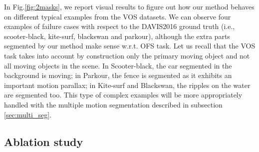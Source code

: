 \documentclass[10pt,twocolumn,letterpaper]{article}
\begin{document}
In Fig.\ref{fig:2masks}, we report visual results to figure out how our method behaves on different typical examples from the VOS datasets. We can observe four examples of failure cases with respect to the DAVIS2016 ground truth (i.e., scooter-black, kite-surf, blackswan and parkour), although the extra parts segmented by our method make sense w.r.t. OFS task. Let us recall that the VOS task takes into account by construction only the primary moving object and not all moving objects in the scene. In Scooter-black, the car segmented in the background is moving; in Parkour, the fence is segmented as it exhibits an important motion parallax; in Kite-surf and Blackswan, the ripples on the water are segmented too. This type of complex examples will be more appropriately handled with the multiple motion segmentation described in subsection \ref{sec:multi_seg}.

\vspace{-0.1cm}
\subsection{Ablation study}
\label{ablation}
\end{document}
